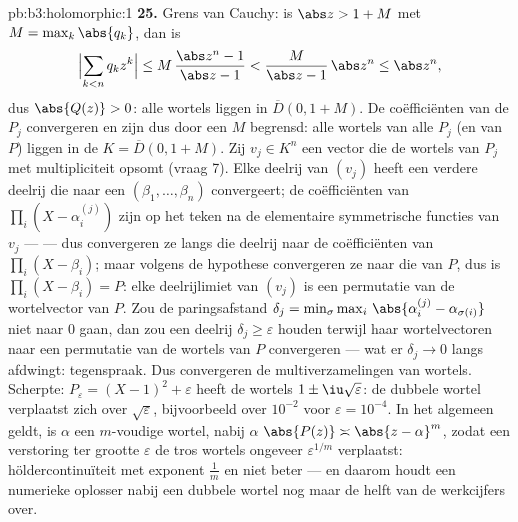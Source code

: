 \begin{solution}{pb:b3:holomorphic:1}
\textbf{25.} Grens van Cauchy: is $\abs z > 1 + M$ met $M =
\max_k\abs{q_k}$, dan is
\[
\Bigl|\sum_{k<n}q_kz^k\Bigr|
\leq M\,\frac{\abs z^n - 1}{\abs z - 1}
< \frac{M}{\abs z - 1}\,\abs z^n \leq \abs z^n,
\]
dus $\abs{Q(z)} > 0$: alle wortels liggen in $\overline D(0,
1+M)$. De coëfficiënten van de $P_j$ convergeren en zijn dus door
een $M$ begrensd: alle wortels van alle $P_j$ (en van $P$) liggen
in de  $K = \overline D(0, 1 + M)$. Zij $v_j \in K^n$ een
vector die de wortels van $P_j$ met multipliciteit opsomt (vraag
7). Elke deelrij van $(v_j)$ heeft een verdere deelrij die naar
een $(\beta_1, \dots, \beta_n)$ convergeert; de coëfficiënten van
$\prod_i(X - \alpha_i^{(j)})$ zijn op het teken na de elementaire
symmetrische functies van $v_j$ ---  --- dus convergeren
ze langs die deelrij naar de coëfficiënten van $\prod_i(X -
\beta_i)$; maar volgens de hypothese convergeren ze naar die van
$P$, dus is $\prod_i(X - \beta_i) = P$: elke deelrijlimiet van
$(v_j)$ is een permutatie van de wortelvector van $P$. Zou de
paringsafstand $\delta_j = \min_\sigma\max_i\,
\abs{\alpha_i^{(j)} - \alpha_{\sigma(i)}}$ niet naar $0$ gaan,
dan zou een deelrij $\delta_j \geq \varepsilon$ houden terwijl
haar wortelvectoren naar een permutatie van de wortels van $P$
convergeren --- wat er $\delta_j \to 0$ langs afdwingt:
tegenspraak. Dus convergeren de multiverzamelingen van wortels.
Scherpte: $P_\varepsilon = (X - 1)^2 + \varepsilon$ heeft de
wortels $1 \pm \iu\sqrt\varepsilon$: de dubbele wortel verplaatst
zich over $\sqrt\varepsilon$, bijvoorbeeld over $10^{-2}$ voor
$\varepsilon = 10^{-4}$. In het algemeen geldt, is $\alpha$ een
$m$-voudige wortel, nabij $\alpha$ $\abs{P(z)} \asymp \abs{z -
\alpha}^m$, zodat een verstoring ter grootte $\varepsilon$ de
tros wortels ongeveer $\varepsilon^{1/m}$ verplaatst:
höldercontinuïteit met exponent $\frac1m$ en niet beter --- en
daarom houdt een numerieke oplosser nabij een dubbele wortel nog
maar de helft van de werkcijfers over.
\end{solution}
